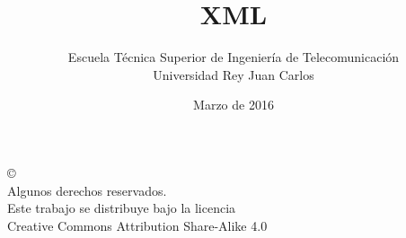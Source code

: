 \documentclass[ucs]{beamer}
\begin{document}
\title[XML]{XML }
\author[GSyC]{Escuela Técnica Superior de Ingeniería de Telecomunicación\\
Universidad Rey Juan Carlos}
\date[2016]{Marzo de 2016}


\begin{frame}
  \titlepage
\end{frame}



\begin{frame}[b]
\begin{flushright}
{\tiny
\copyright \insertshortdate~\insertshortauthor \\
  Algunos derechos reservados. \\
  Este trabajo se distribuye bajo la licencia \\
  Creative Commons Attribution Share-Alike 4.0\\
}
\end{flushright}  
\end{frame}







\end{document}
